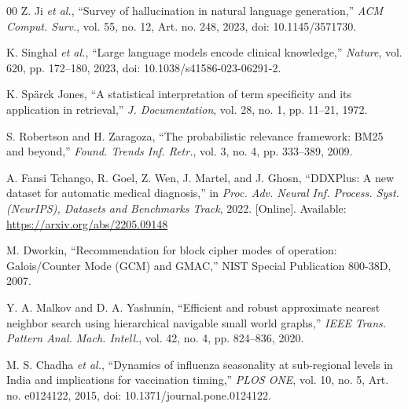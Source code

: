 \documentclass[conference]{IEEEtran}
\begin{document}
\begin{thebibliography}{00}
 Z. Ji \textit{et al.}, ``Survey of hallucination in natural language generation,'' \textit{ACM Comput. Surv.}, vol. 55, no. 12, Art. no. 248, 2023, doi: 10.1145/3571730.

 K. Singhal \textit{et al.}, ``Large language models encode clinical knowledge,'' \textit{Nature}, vol. 620, pp. 172--180, 2023, doi: 10.1038/s41586-023-06291-2.

 K. Sp\"arck Jones, ``A statistical interpretation of term specificity and its application in retrieval,'' \textit{J. Documentation}, vol. 28, no. 1, pp. 11--21, 1972.

 S. Robertson and H. Zaragoza, ``The probabilistic relevance framework: BM25 and beyond,'' \textit{Found. Trends Inf. Retr.}, vol. 3, no. 4, pp. 333--389, 2009.

 A. Fansi Tchango, R. Goel, Z. Wen, J. Martel, and J. Ghosn, ``DDXPlus: A new dataset for automatic medical diagnosis,'' in \textit{Proc. Adv. Neural Inf. Process. Syst. (NeurIPS), Datasets and Benchmarks Track}, 2022. [Online]. Available: \url{https://arxiv.org/abs/2205.09148}

 M. Dworkin, ``Recommendation for block cipher modes of operation: Galois/Counter Mode (GCM) and GMAC,'' NIST Special Publication 800-38D, 2007.

 Y. A. Malkov and D. A. Yashunin, ``Efficient and robust approximate nearest neighbor search using hierarchical navigable small world graphs,'' \textit{IEEE Trans. Pattern Anal. Mach. Intell.}, vol. 42, no. 4, pp. 824--836, 2020.

 M. S. Chadha \textit{et al.}, ``Dynamics of influenza seasonality at sub-regional levels in India and implications for vaccination timing,'' \textit{PLOS ONE}, vol. 10, no. 5, Art. no. e0124122, 2015, doi: 10.1371/journal.pone.0124122.

\end{thebibliography}
\end{document}
